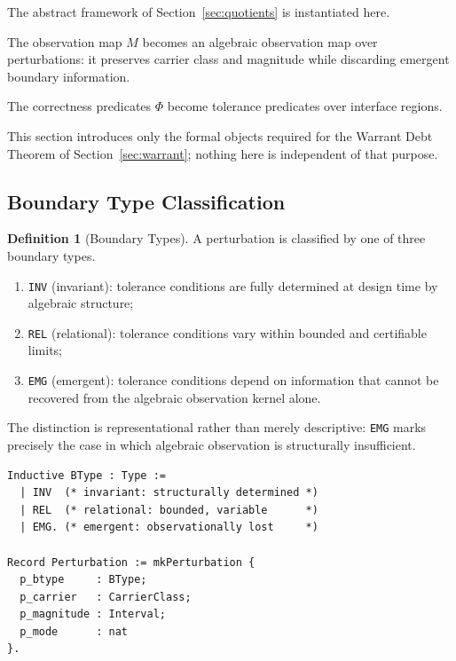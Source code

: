 \documentclass[12pt]{article}
\theoremstyle{plain}
\theoremstyle{definition}
\newtheorem{definition}[theorem]{Definition}
\theoremstyle{remark}
\begin{document}
The abstract framework of Section~\ref{sec:quotients} is instantiated
here.

The observation map $M$ becomes an algebraic observation map over
perturbations: it preserves carrier class and magnitude while
discarding emergent boundary information.

The correctness predicates $\Phi$ become tolerance predicates over
interface regions.

This section introduces only the formal objects required for the
Warrant Debt Theorem of Section~\ref{sec:warrant}; nothing here is
independent of that purpose.

\subsection{Boundary Type Classification}

\begin{definition}[Boundary Types]

A perturbation is classified by one of three boundary types.

\begin{enumerate}[label=(\roman*),noitemsep]
    \item \texttt{INV} (invariant):
    tolerance conditions are fully determined at design time by
    algebraic structure;

    \item \texttt{REL} (relational):
    tolerance conditions vary within bounded and certifiable limits;

    \item \texttt{EMG} (emergent):
    tolerance conditions depend on information that cannot be
    recovered from the algebraic observation kernel alone.
\end{enumerate}

The distinction is representational rather than merely descriptive:
\texttt{EMG} marks precisely the case in which algebraic observation
is structurally insufficient.

\end{definition}

\begin{lstlisting}[style=rocq,
caption={Boundary types and perturbation record.}]
Inductive BType : Type :=
  | INV  (* invariant: structurally determined *)
  | REL  (* relational: bounded, variable      *)
  | EMG. (* emergent: observationally lost     *)

Record Perturbation := mkPerturbation {
  p_btype     : BType;
  p_carrier   : CarrierClass;
  p_magnitude : Interval;
  p_mode      : nat
}.
\end{lstlisting}
\end{document}
